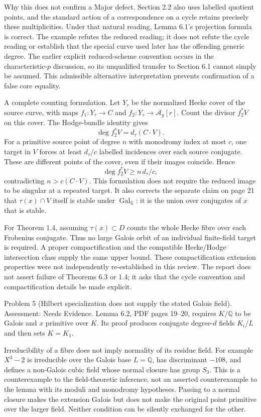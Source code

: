 \documentclass[10pt]{article}
\begin{document}
Why this does not confirm a Major defect. Section 2.2 also uses labelled quotient points, and the standard action of a correspondence on a cycle retains precisely these multiplicities. Under that natural reading, Lemma 6.1’s projection formula is correct. The example refutes the reduced reading; it does not refute the cycle reading or establish that the special curve used later has the offending generic degree. The earlier explicit reduced-scheme convention occurs in the characteristic-\(p\) discussion, so its unqualified transfer to Section 6.1 cannot simply be assumed. This admissible alternative interpretation prevents confirmation of a false core equality.\par
A complete counting formulation. Let \(Y_\tau\) be the normalized Hecke cover of the source curve, with maps \(f_1:Y_\tau\to C\) and \(f_2:Y_\tau\to\mathcal A_g[r]\). Count the divisor \(f_2^*V\) on this cover. The Hodge-bundle identity gives \[\deg f_2^*V=d_\tau(C\cdot V).\] For a primitive source point of degree \(n\) with monodromy index at most \(c\), one target in \(V\) forces at least \(d_\tau/c\) labelled incidences over each source conjugate. These are different points of the cover, even if their images coincide. Hence \[\deg f_2^*V\geq n\,d_\tau/c,\] contradicting \(n>c(C\cdot V)\). This formulation does not require the reduced image to be singular at a repeated target. It also corrects the separate claim on page 21 that \(\tau(x)\cap V\) itself is stable under \(\operatorname{Gal}_{\mathbb Q}\): it is the union over conjugates of \(x\) that is stable.\par
For Theorem 1.4, assuming \(\tau(x)\subset D\) counts the whole Hecke fibre over each Frobenius conjugate. Thus no large Galois orbit of an individual finite-field target is required. A proper compactification and the compatible Hecke/Hodge intersection class supply the same upper bound. These compactification extension properties were not independently re-established in this review. The report does not assert failure of Theorems 6.3 or 1.4; it asks that the cycle convention and compactification details be made explicit.\par
Problem 5 (Hilbert specialization does not supply the stated Galois field).  Assessment: Needs Evidence. Lemma 6.2, PDF pages 19–20, requires \(K/\mathbb Q\) to be Galois and \(x\) primitive over \(K\). Its proof produces conjugate degree-\(d\) fields \(K_i/L\) and then sets \(K=K_1\).\par
Irreducibility of a fibre does not imply normality of its residue field. For example \(X^3-2\) is irreducible over the Galois base \(L=\mathbb Q\), has discriminant \(-108\), and defines a non-Galois cubic field whose normal closure has group \(S_3\). This is a counterexample to the field-theoretic inference, not an asserted counterexample to the lemma with its moduli and monodromy hypotheses. Passing to a normal closure makes the extension Galois but does not make the original point primitive over the larger field. Neither condition can be silently exchanged for the other.\par
\end{document}
